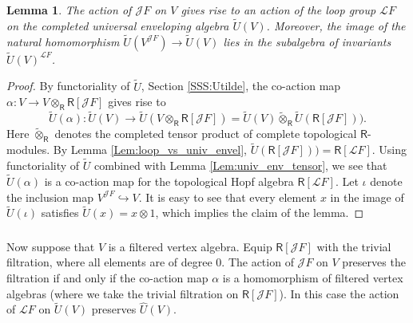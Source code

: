 \documentclass{amsart}
\newtheorem{Lem}[Thm]{Lemma}
\theoremstyle{definition}
\newcommand{\sss}{\subsubsection{}}
\newcommand{\Ring}{\mathsf{R}}
\newcommand{\Jet}{\mathscr{J}}
\newcommand{\Loop}{\mathscr{L}}
\numberwithin{equation}{section}
\begin{document}

\begin{Lem}\label{Lem:action_on_modes}
The action of $\Jet F$ on $V$ gives rise to 
an action of the loop group $\Loop F$ on the completed universal enveloping algebra $\tilde{U}(V)$. Moreover, the image of the natural homomorphism 
$\tilde{U}(V^{\Jet F})\rightarrow \tilde{U}(V)$ lies in the subalgebra of invariants $\tilde{U}(V)^{\Loop F}$.
\end{Lem}
\begin{proof} 
By  functoriality of $\widetilde{U}$, Section \ref{SSS:Utilde},  the co-action map $\alpha: V\rightarrow V\otimes_\Ring\Ring[\Jet F]$ gives rise to 
$$\widetilde{U}(\alpha):  \widetilde{U}(V)\rightarrow \widetilde{U}(V\otimes_{\Ring}\Ring[\Jet F])=
\widetilde{U}(V)\widetilde{\otimes}_{\Ring}\widetilde{U}(\Ring[\Jet F])).$$
Here $\widetilde{\otimes}_\Ring$ denotes the completed tensor product of complete topological $\Ring$-modules.
By Lemma \ref{Lem:loop_vs_univ_envel}, 
$\widetilde{U}(\Ring[\Jet F]))=\Ring[\Loop F]$. 
Using functoriality of $\widetilde{U}$ combined with Lemma \ref{Lem:univ_env_tensor}, we see that $\widetilde{U}(\alpha)$ is a co-action map for the topological Hopf algebra $\Ring[\Loop F]$. Let $\iota$ denote the inclusion map 
$V^{\Jet F}\hookrightarrow V$. It is easy to see that every element $x$ in the image of $\widetilde{U}(\iota)$ satisfies $\widetilde{U}(x)=x\otimes 1$, which implies the claim of the lemma. 
\end{proof}

\sss Now suppose that $V$ is a filtered vertex algebra. Equip $\Ring[\Jet F]$ with the trivial filtration, where all elements are of degree $0$.
The action of $\Jet F$ on $V$ preserves the filtration if and only if the co-action map $\alpha$ is a homomorphism of filtered vertex algebras (where we take the trivial filtration on $\Ring[\Jet F]$). 
In this case the action of $\Loop F$ on 
$\widetilde{U}(V)$ preserves $\widehat{U}(V)$.
\end{document}
